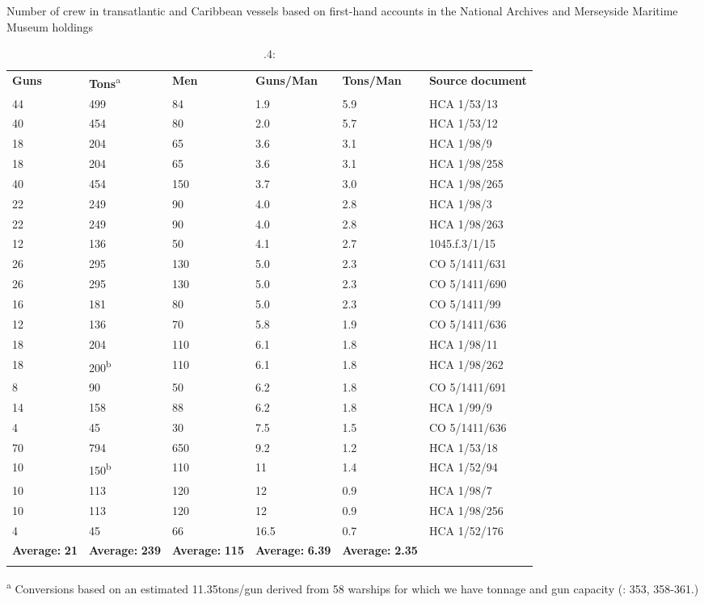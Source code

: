 \begin{table}
\caption{\label{tab:key:3}.4:} Number of crew in transatlantic and Caribbean vessels based on first-hand accounts in the National Archives and Merseyside Maritime Museum holdings

\begin{tabularx}{\textwidth}{XXXXXX}
\lsptoprule

 \textbf{Guns} &  \textbf{Tons}\textsuperscript{a} &  \textbf{Men} & \textbf{Guns/Man} & \textbf{Tons/Man} & \textbf{Source} \textbf{document}\\
 44 &  499 &  84 & 1.9 & 5.9 & HCA 1/53/13\\
 40 &  454 &  80 & 2.0 & 5.7 & HCA 1/53/12\\
 18 &  204 &  65 & 3.6 & 3.1 & HCA 1/98/9 \\
 18 &  204 &  65 & 3.6 & 3.1 & HCA 1/98/258\\
 40 &  454 &  150 & 3.7 & 3.0 & HCA 1/98/265\\
 22 &  249 &  90 & 4.0 & 2.8 & HCA 1/98/3\\
 22 &  249 &  90 & 4.0 & 2.8 & HCA 1/98/263\\
 12 &  136 &  50 & 4.1 & 2.7 & 1045.f.3/1/15\\
 26 &  295 &  130 & 5.0 & 2.3 & CO 5/1411/631\\
 26 &  295 &  130 & 5.0 & 2.3 & CO 5/1411/690\\
 16 &  181 &  80 & 5.0 & 2.3 & CO 5/1411/99\\
 12 &  136 &  70 & 5.8 & 1.9 & CO 5/1411/636\\
 18 &  204 &  110 & 6.1 & 1.8 & HCA 1/98/11\\
 18 &  200\textsuperscript{b} &  110 & 6.1 & 1.8 & HCA 1/98/262\\
 8 &  90 &  50 & 6.2 & 1.8 & CO 5/1411/691\\
 14 &  158 &  88 & 6.2 & 1.8 & HCA 1/99/9\\
 4 &  45 &  30 & 7.5 & 1.5 & CO 5/1411/636\\
 70 &  794 &  650 & 9.2 & 1.2 & HCA 1/53/18\\
 10 &  150\textsuperscript{b} &  110 & 11 & 1.4 & HCA 1/52/94\\
 10 &  113 &  120 & 12 & 0.9 & HCA 1/98/7\\
 10 &  113 &  120 & 12 & 0.9 & HCA 1/98/256\\
 4 &  45 &  66 & 16.5 & 0.7 & HCA 1/52/176\\
 \textbf{Average:} \textbf{21} &  \textbf{Average:} \textbf{239} &  \textbf{Average:} \textbf{115} & \textbf{Average:} \textbf{6.39} & \textbf{Average:} \textbf{2.35} & \\
\lspbottomrule
\end{tabularx}\end{table}
\textsuperscript{a}\textbf{\textsuperscript{} }Conversions based on an estimated 11.35tons/gun derived from 58 warships for which we have tonnage and gun capacity (\citealt{Bicheno2012}: 353, 358-361.) 

